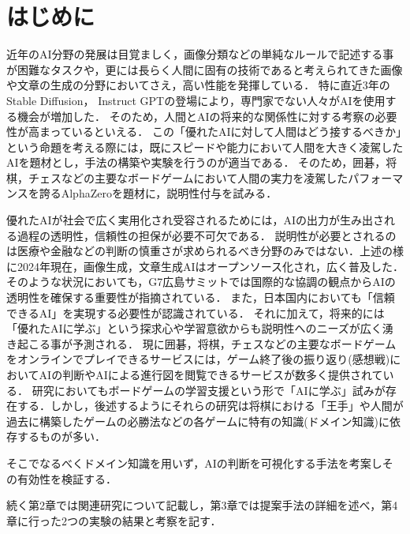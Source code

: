 \chapter{はじめに}
近年のAI分野の発展は目覚ましく，画像分類などの単純なルールで記述する事が困難なタスクや，更には長らく人間に固有の技術であると考えられてきた画像や文章の生成の分野においてさえ，高い性能を発揮している\cite{cat}．
特に直近3年のStable Diffusion\cite{diffusion}， Instruct GPT\cite{GPT}の登場により，専門家でない人々がAIを使用する機会が増加した．
そのため，人間とAIの将来的な関係性に対する考察の必要性が高まっているといえる．
この「優れたAIに対して人間はどう接するべきか」という命題を考える際には，既にスピードや能力において人間を大きく凌駕したAIを題材とし，手法の構築や実験を行うのが適当である．
そのため，囲碁，将棋，チェスなどの主要なボードゲームにおいて人間の実力を凌駕したパフォーマンスを誇るAlphaZeroを題材に，説明性付与を試みる．

優れたAIが社会で広く実用化され受容されるためには，AIの出力が生み出される過程の透明性，信頼性の担保が必要不可欠である．
説明性が必要とされるのは医療や金融などの判断の慎重さが求められるべき分野のみではない．上述の様に2024年現在，画像生成，文章生成AIはオープンソース化され，広く普及した．
そのような状況においても，G7広島サミットでは国際的な協調の観点からAIの透明性を確保する重要性が指摘されている\cite{Hiroshima}．
また，日本国内においても「信頼できるAI」を実現する必要性が認識されている\cite{グランドデザイン}．
それに加えて，将来的には「優れたAIに学ぶ」という探求心や学習意欲からも説明性へのニーズが広く湧き起こる事が予測される．
現に囲碁，将棋，チェスなどの主要なボードゲームをオンラインでプレイできるサービスには，ゲーム終了後の振り返り(感想戦)においてAIの判断やAIによる進行図を閲覧できるサービスが数多く提供されている\cite{panda}\cite{wars}．
研究においてもボードゲームの学習支援という形で「AIに学ぶ」試みが存在する．しかし，後述するようにそれらの研究は将棋における「王手」や人間が過去に構築したゲームの必勝法などの各ゲームに特有の知識(ドメイン知識)に依存するものが多い．

そこでなるべくドメイン知識を用いず，AIの判断を可視化する手法を考案しその有効性を検証する．

続く第2章では関連研究について記載し，第3章では提案手法の詳細を述べ，第4章に行った2つの実験の結果と考察を記す．

